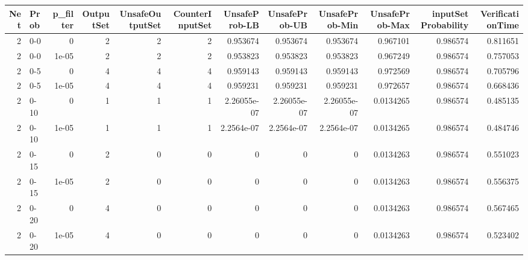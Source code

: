 \begin{tabular}{rlrrrrrrrrrr}
\hline
   Net & Prob   &   p\_filter &   OutputSet &   UnsafeOutputSet &   CounterInputSet &   UnsafeProb-LB &   UnsafeProb-UB &   UnsafeProb-Min &   UnsafeProb-Max &   inputSet Probability &   VerificationTime \\
\hline
     2 & 0-0    &      0     &           2 &                 2 &                 2 &     0.953674    &     0.953674    &      0.953674    &        0.967101  &               0.986574 &           0.811651 \\
     2 & 0-0    &      1e-05 &           2 &                 2 &                 2 &     0.953823    &     0.953823    &      0.953823    &        0.967249  &               0.986574 &           0.757053 \\
     2 & 0-5    &      0     &           4 &                 4 &                 4 &     0.959143    &     0.959143    &      0.959143    &        0.972569  &               0.986574 &           0.705796 \\
     2 & 0-5    &      1e-05 &           4 &                 4 &                 4 &     0.959231    &     0.959231    &      0.959231    &        0.972657  &               0.986574 &           0.668436 \\
     2 & 0-10   &      0     &           1 &                 1 &                 1 &     2.26055e-07 &     2.26055e-07 &      2.26055e-07 &        0.0134265 &               0.986574 &           0.485135 \\
     2 & 0-10   &      1e-05 &           1 &                 1 &                 1 &     2.2564e-07  &     2.2564e-07  &      2.2564e-07  &        0.0134265 &               0.986574 &           0.484746 \\
     2 & 0-15   &      0     &           2 &                 0 &                 0 &     0           &     0           &      0           &        0.0134263 &               0.986574 &           0.551023 \\
     2 & 0-15   &      1e-05 &           2 &                 0 &                 0 &     0           &     0           &      0           &        0.0134263 &               0.986574 &           0.556375 \\
     2 & 0-20   &      0     &           4 &                 0 &                 0 &     0           &     0           &      0           &        0.0134263 &               0.986574 &           0.567465 \\
     2 & 0-20   &      1e-05 &           4 &                 0 &                 0 &     0           &     0           &      0           &        0.0134263 &               0.986574 &           0.523402 \\

\end{tabular}
